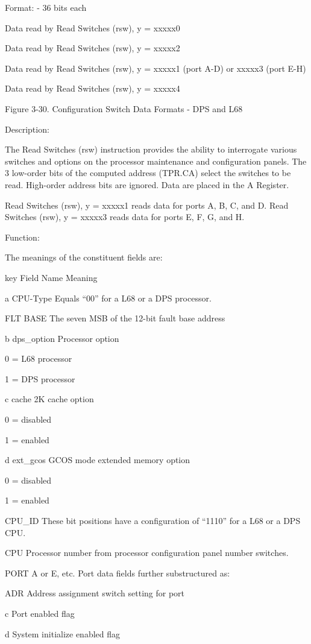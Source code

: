 Format: - 36 bits each

Data read by Read Switches (rsw), y = xxxxx0

Data read by Read Switches (rsw), y = xxxxx2

Data read by Read Switches (rsw), y = xxxxx1 (port A-D) or xxxxx3 (port E-H)

Data read by Read Switches (rsw), y = xxxxx4

Figure 3-30. Configuration Switch Data Formats - DPS and L68

Description:

The Read Switches (rsw) instruction provides the ability to interrogate various
switches and options on the processor maintenance and configuration panels. The
3 low-order bits of the computed address (TPR.CA) select the switches to be
read. High-order address bits are ignored. Data are placed in the A Register.

Read Switches (rsw), y = xxxxx1 reads data for ports A, B, C, and D. Read
Switches (rsw), y = xxxxx3 reads data for ports E, F, G, and H.

Function:

The meanings of the constituent fields are:

key Field Name Meaning

a CPU-Type Equals {``}00'' for a L68 or a DPS processor.

FLT BASE The seven MSB of the 12-bit fault base address

b dps\_option Processor option

0 = L68 processor

1 = DPS processor

c cache 2K cache option

0 = disabled

1 = enabled

d ext\_gcos GCOS mode extended memory option

0 = disabled

1 = enabled

CPU\_ID These bit positions have a configuration of {``}1110'' for a L68 or a
DPS CPU.

CPU Processor number from processor configuration panel number switches.

PORT A or E, etc.  Port data fields further substructured as:

ADR Address assignment switch setting for port

c Port enabled flag

d System initialize enabled flag

